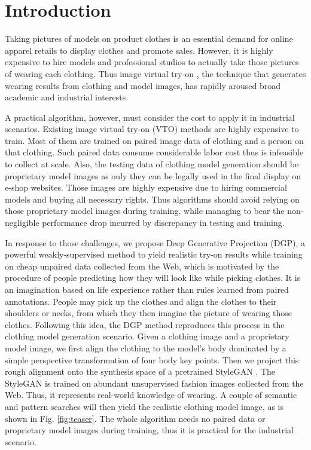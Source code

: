 \documentclass[10pt,twocolumn,letterpaper]{article}
\begin{document}
\section{Introduction}

\label{sec:intro}
Taking pictures of models on product clothes is an essential demand for online apparel retails to display clothes and promote sales. However, it is highly expensive to hire models and professional studios to actually take those pictures of wearing each clothing. Thus image virtual try-on \cite{han2018viton,wang2018toward,santesteban2019learning,dong2019towards,hauswiesner2013virtual,neuberger2020image,jae2019viton,yang2020towards,dong2019fw,gao2021shape}, the technique that generates wearing results from clothing and model images, has rapidly aroused broad academic and industrial interests.

A practical algorithm, however, must consider the cost to apply it in  industrial scenarios. Existing image virtual try-on (VTO) methods are highly expensive to train. Most of them \cite{han2018viton,yang2020towards,minar2020cp,jae2019viton,wang2018toward,issenhuth2020not} are trained on paired image data of clothing and a person on that clothing. Such paired data consume considerable labor cost thus is infeasible to collect at scale. Also, the testing data of clothing model generation should be proprietary model images as only they can be legally used in the final display on e-shop websites. Those images are highly expensive due to hiring commercial models and buying all necessary rights. Thus algorithms should avoid relying on those proprietary model images during training, while managing to bear the non-negligible performance drop incurred by discrepancy in testing and training.


In response to those challenges, we propose Deep Generative Projection (DGP), a powerful weakly-supervised method to yield realistic try-on results while training on cheap unpaired data collected from the Web, which is motivated by the procedure of people predicting how they will look like while picking clothes. It is an imagination based on life experience rather than rules learned from paired annotations. People may pick up the clothes and align the clothes to their shoulders or necks, from which they then imagine the picture of wearing those clothes. Following this idea, the DGP method reproduces this process in the clothing model generation scenario. Given a clothing image and a proprietary model image, we first align the clothing to the model's body dominated by a simple perspective transformation \cite{mezirow1978perspective} of four body key points. Then we project this rough alignment onto the synthesis space of a pretrained StyleGAN \cite{karras2019style,karras2020analyzing}. The StyleGAN is trained on abundant unsupervised fashion images collected from the Web. Thus, it represents real-world knowledge of wearing. A couple of semantic and pattern searches will then yield the realistic clothing model image, as is shown in Fig. \ref{fig:teaser}. The whole algorithm needs no paired data or proprietary model images during training, thus it is practical for the industrial scenario.
\end{document}
